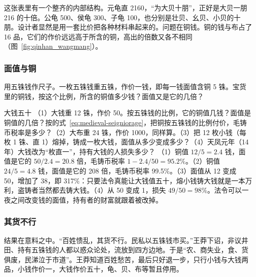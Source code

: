 这张表里有一个整齐的内部结构。元龟直 2160，“为大贝十朋”，正好是大贝一朋 216 的十倍。公龟 500、侯龟 300、子龟 100，也分别是壮贝、幺贝、小贝的十朋\cite{hanshu}。设计者显然是用一套比价把各种材料串起来的。问题在铜钱。铜的钱与布占了 16 品，它们的作价远远高于所含的铜，高出的倍数又各不相同（图~\ref{fig:qinhan_wangmang}）。

\subsubsection{面值与铜}
用五铢钱作尺子。一枚五铢钱重五铢，作价一钱，即每一钱面值含铜 5 铢。宝货里的铜钱，按这个比例，所含的铜值多少钱？面值又是它的几倍？

\begin{example}{大钱五十}\label{ex:qinhan-wm}
（1）大钱重 12 铢，作价 50。按五铢钱的比例，它的铜值几钱？面值是铜值的几倍？按的式~\eqref{eq:medieval-seigniorage}，把铜按五铢钱的比例付价，毛铸币税率是多少？（2）大布重 24 铢，作价 1000，同样算。（3）把 12 枚小钱（每枚 1 铢、直 1）熔掉，铸成一枚大钱，面值从多少变成多少？（4）天凤元年（14 年）大钱改为“枚直一”，持有大钱的人损失多少？
\solution （1）铜值 $12/5=2.4$ 钱，面值是它的 $50/2.4=20.8$ 倍，毛铸币税率 $1-2.4/50=95.2\%$。（2）铜值 $24/5=4.8$ 钱，面值是它的 208 倍，毛铸币税率 99.5\%。（3）面值从 12 变成 50，增加了 38，即 317\%：只要法令真能让大钱值五十，熔小钱铸大钱就是一本万利，盗铸者当然都去铸大钱。（4）从 50 变成 1，损失 $49/50=98\%$。法令可以一夜之间改变钱的面值，持有者的财富就跟着被改掉。
\end{example}


\subsubsection{其货不行}
结果在意料之中。“百姓愦乱，其货不行。民私以五铢钱市买。”王莽下诏，非议井田、持有五铢钱的人都以惑众论处，流放到四方边地。于是“农、商失业，食、货俱废，民涕泣于市道”\cite{hanshu}。王莽知道百姓愁苦，最后只好退一步，只行小钱与大钱两品，小钱作价一，大钱作价五十，龟、贝、布等暂且停用\cite{hanshu}。

